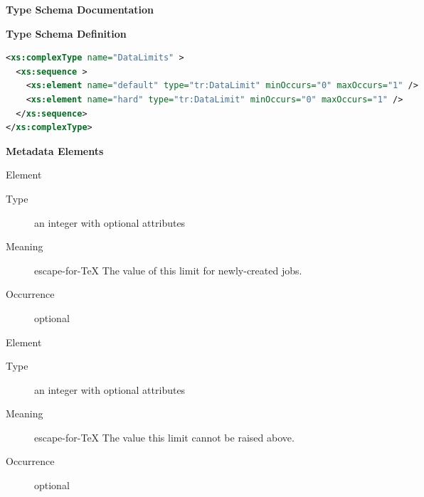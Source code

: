 \documentclass{ivoa}
\begin{document}
\begingroup
      	\renewcommand*\descriptionlabel[1]{%
      	\hbox to 5.5em{\emph{#1}\hfil}}\vspace{2ex}\noindent\textbf{ Type Schema Documentation}


\vspace{1ex}\noindent\textbf{ Type Schema Definition}

\begin{lstlisting}[language=XML,basicstyle=\footnotesize]
<xs:complexType name="DataLimits" >
  <xs:sequence >
    <xs:element name="default" type="tr:DataLimit" minOccurs="0" maxOccurs="1" />
    <xs:element name="hard" type="tr:DataLimit" minOccurs="0" maxOccurs="1" />
  </xs:sequence>
</xs:complexType>
\end{lstlisting}

\vspace{0.5ex}\noindent\textbf{ Metadata Elements}

\begingroup\small\begin{bigdescription}\item[Element \xmlel{default}]
\begin{description}
\item[Type] an integer with optional attributes
\item[Meaning] escape-for-TeX{{{
          The value of this limit for newly-created jobs.
          }}}
\item[Occurrence] optional

\end{description}
\item[Element \xmlel{hard}]
\begin{description}
\item[Type] an integer with optional attributes
\item[Meaning] escape-for-TeX{{{
          The value this limit cannot be raised above.
          }}}
\item[Occurrence] optional

\end{description}


\end{bigdescription}\endgroup

\endgroup
\end{document}
